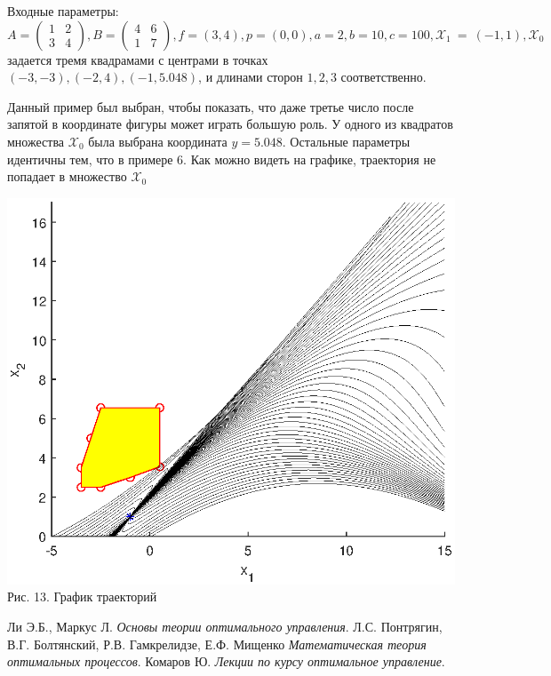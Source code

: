 \documentclass{article}
\theoremstyle{definition}
\begin{document}
Входные параметры: $A = \begin{pmatrix} 1 & 2 \\ 3 & 4\end{pmatrix}, B = \begin{pmatrix} 4 & 6 \\ 1 & 7\end{pmatrix}, 
f = (3, 4), p = (0,0), a = 2, b = 10, c = 100, \mathcal{X}_1~=~(-1,1), \mathcal{X}_0$
 задается тремя квадрамами с центрами в точках $(-3, -3), (-2,4), (-1,5.048)$,
и длинами сторон $1, 2, 3$ соответственно.

Данный пример был выбран, чтобы показать, что даже третье число после запятой в координате фигуры может играть большую роль.
У одного из квадратов множества $\mathcal{X}_0$ была выбрана координата $y = 5.048$.
Остальные параметры идентичны тем, что в примере 6.
Как можно видеть на графике, траектория не попадает в множество $\mathcal{X}_0$

\begin{center}
{\includegraphics[width=15cm]{example7.eps}}
{Рис. 13. График траекторий}
\end{center}
  

\newpage
\begin{thebibliography}{9}
   Ли Э.Б., Маркус Л. \emph{Основы теории оптимального управления}.
   Л.С. Понтрягин, В.Г. Болтянский, Р.В. Гамкрелидзе, Е.Ф. Мищенко \emph{Математическая теория оптимальных процессов}.
   Комаров Ю. \emph{Лекции по курсу оптимальное управление}.
\end{thebibliography}
\end{document}
